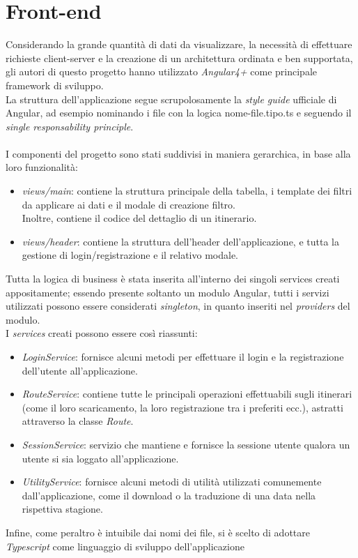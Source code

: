 \documentclass[11pt]{report}
\begin{document}
\section{Front-end}
Considerando la grande quantità di dati da visualizzare, la necessità di effettuare richieste client-server e la creazione di un architettura ordinata e ben supportata, gli autori di questo progetto hanno utilizzato \textit{Angular4+} come principale framework di sviluppo.
\\La struttura dell'applicazione segue scrupolosamente la \textit{style guide} ufficiale di Angular, ad esempio nominando i file con la logica nome-file.tipo.ts e seguendo il \textit{single responsability principle}.
\\\\I componenti del progetto sono stati suddivisi in maniera gerarchica, in base alla loro funzionalità:
\begin{itemize}
	\item \textit{views/main}: contiene la struttura principale della tabella, i template dei filtri da applicare ai dati e il modale di creazione filtro.
	\\Inoltre, contiene il codice del dettaglio di un itinerario.
	\item \textit{views/header}: contiene la struttura dell'header dell'applicazione, e tutta la gestione di login/registrazione e il relativo modale.
\end{itemize}
Tutta la logica di business è stata inserita all'interno dei singoli services creati appositamente; essendo presente soltanto un modulo Angular, tutti i servizi utilizzati possono essere considerati \textit{singleton}, in quanto inseriti nel \textit{providers} del modulo.
\\I \textit{services} creati possono essere così riassunti:
\begin{itemize}
	\item \textit{LoginService}: fornisce alcuni metodi per effettuare il login e la registrazione dell'utente all'applicazione.
	\item \textit{RouteService}: contiene tutte le principali operazioni effettuabili sugli itinerari (come il loro scaricamento, la loro registrazione tra i preferiti ecc.), astratti attraverso la classe \textit{Route}.
	\item \textit{SessionService}: servizio che mantiene e fornisce la sessione utente qualora un utente si sia loggato all'applicazione.
	\item \textit{UtilityService}: fornisce alcuni metodi di utilità utilizzati comunemente dall'applicazione, come il download o la traduzione di una data nella rispettiva stagione.
\end{itemize}
Infine, come peraltro è intuibile dai nomi dei file, si è scelto di adottare \textit{Typescript} come linguaggio di sviluppo dell'applicazione
\pagebreak
\end{document}
